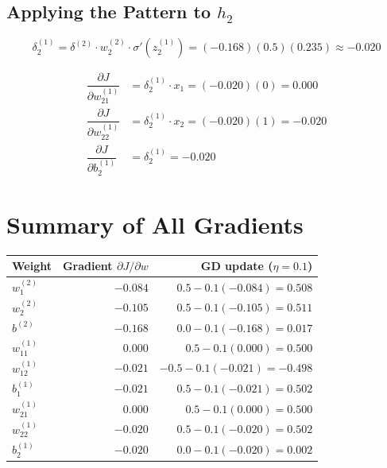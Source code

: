\documentclass[12pt, a4paper]{article}
\newif\ifstudentmode
\newcommand{\sol}[2][6cm]{%
  \ifstudentmode
    \underline{\hspace{#1}}%
  \else
    {#2}%
  \fi
}
\theoremstyle{definition}
\newcommand{\sigmoid}{\sigma}
\newcommand{\pd}[2]{\dfrac{\partial #1}{\partial #2}}
\begin{document}
\subsection{Applying the Pattern to $h_2$}

\[
  \delta^{(1)}_2
  = \delta^{(2)} \cdot w^{(2)}_2 \cdot \sigmoid'(z^{(1)}_2)
  = (-0.168)(0.5)(0.235)
  \approx \sol[3cm]{-0.020}
\]

\begin{align*}
  \pd{J}{w^{(1)}_{21}} &= \delta^{(1)}_2 \cdot x_1 = (-0.020)(0) = \sol[2.5cm]{0.000} \\[4pt]
  \pd{J}{w^{(1)}_{22}} &= \delta^{(1)}_2 \cdot x_2 = (-0.020)(1) = \sol[2.5cm]{-0.020} \\[4pt]
  \pd{J}{b^{(1)}_2}    &= \delta^{(1)}_2 = \sol[2.5cm]{-0.020}
\end{align*}

\section{Summary of All Gradients}

\begin{center}
\renewcommand{\arraystretch}{1.5}
\begin{tabular}{lrr}
\toprule
Weight & Gradient $\partial J / \partial w$ & GD update ($\eta=0.1$) \\
\midrule
$w^{(2)}_1$ & $-0.084$ & $0.5 - 0.1(-0.084) = 0.508$ \\
$w^{(2)}_2$ & $-0.105$ & $0.5 - 0.1(-0.105) = 0.511$ \\
$b^{(2)}$   & $-0.168$ & $0.0 - 0.1(-0.168) = 0.017$ \\
\midrule
$w^{(1)}_{11}$ & $\phantom{-}0.000$ & $0.5 - 0.1(0.000) = 0.500$ \\
$w^{(1)}_{12}$ & $-0.021$ & $-0.5 - 0.1(-0.021) = -0.498$ \\
$b^{(1)}_1$    & $-0.021$ & $0.5 - 0.1(-0.021) = 0.502$ \\
\midrule
$w^{(1)}_{21}$ & $\phantom{-}0.000$ & $0.5 - 0.1(0.000) = 0.500$ \\
$w^{(1)}_{22}$ & $-0.020$ & $0.5 - 0.1(-0.020) = 0.502$ \\
$b^{(1)}_2$    & $-0.020$ & $0.0 - 0.1(-0.020) = 0.002$ \\
\bottomrule
\end{tabular}
\end{center}
\end{document}
